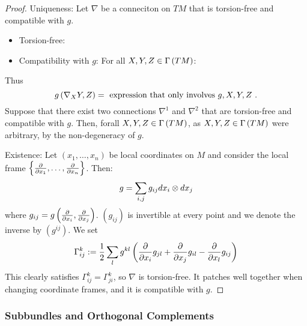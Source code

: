 \documentclass[main.tex]{subfiles}
\begin{document}
\begin{proof}
  Uniqueness: Let $\nabla$ be a conneciton on $TM$ that is torsion-free and compatible with $g$.
  \begin{itemize}
    \item Torsion-free:
    \item Compatibility with $g$: For all $X, Y, Z \in \Gamma\left( TM \right)$:
  \end{itemize}

  Thus
  \[
  g\left(  \nabla_X Y,  Z \right) = \text{ expression that only involves $g, X, Y, Z$ .}
  \]
  Suppose that there exist two connections $\nabla^1$ and $\nabla^2$ that are torsion-free and compatible with $g$. Then, forall $X, Y, Z \in \Gamma\left( TM \right)$,
   as $X, Y, Z \in \Gamma\left( TM \right)$ were arbitrary, by the non-degeneracy of $g$.

  Existence: Let $(x_1, \dots, x_n)$ be local coordinates on $M$ and consider the local frame $\left\{\frac{ \partial  }{ \partial x_1 }, \dots, \frac{ \partial  }{ \partial x_n }\right\}$. Then:
  \[
    g = \sum_{i,j} g_{ij} dx_i \otimes dx_j
  \]
  where $g_{ij} = g\left(  \frac{ \partial  }{ \partial x_i }, \frac{ \partial  }{ \partial x_j }  \right)$.
  $(g_{ij})$ is invertible at every point and we denote the inverse by $(g^{ij})$. We set
  \[
  \Gamma^k_{ij} := \frac{1}{2}\sum_l g^{kl} \left(  \frac{ \partial  }{ \partial x_i } g_{jl} + \frac{ \partial  }{ \partial x_j } g_{il} - \frac{ \partial  }{ \partial x_l }g_{ij}  \right)
  \]
  This clearly satisfies $\Gamma^k_{ij} = \Gamma^k_{ji}$, so $\nabla$ is torsion-free. It patches well together when changing coordinate frames, and it is compatible with $g$.
\end{proof}

\subsubsection{Subbundles and Orthogonal Complements}
\end{document}
